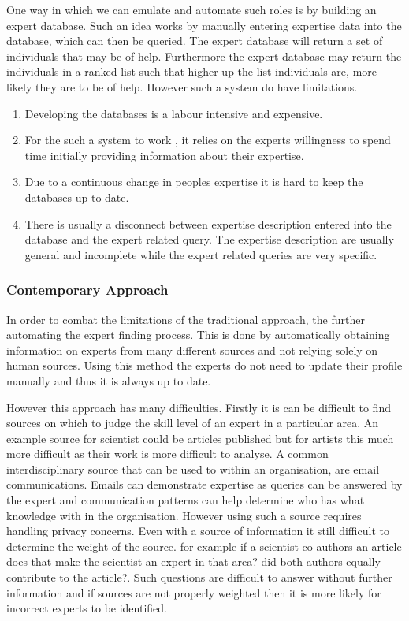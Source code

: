 \documentclass[a4paper,oneside,11pt]{report}
\begin{document}
One way in which we can emulate and automate such roles is by building an expert database. Such an idea works by manually entering expertise data into the database, which can then be queried. The expert database will return a set of individuals that may be of help. Furthermore the expert database  may return the individuals in a ranked list such that higher up the list individuals are, more likely they are to be of help. However such a system do have limitations\autocite{kobsaseid2003}.
\begin{enumerate}
	\item Developing the databases is a labour intensive and expensive.
	\item For the such a system to work , it relies on the experts willingness to spend time 		  			  initially providing information about their expertise.
	\item Due to a continuous change in peoples expertise it is hard to keep the databases up to 				  date.
	\item There is usually a disconnect between expertise description entered into the database and 	          the expert related query. The expertise description are usually general and incomplete                                                                            		  while the expert related queries are very specific. 
\end{enumerate}

\subsubsection{Contemporary Approach}
In order to combat the limitations of the traditional approach, the further automating the expert finding process. This is done by automatically obtaining information on experts from many different sources and not relying solely on human sources\autocite{kobsaseid2003}. Using this method the experts do not need to update their profile manually and thus it is always up to date. 

However this approach has many difficulties. Firstly it is can be difficult to find sources on which to judge the skill level of an expert in a particular area. An example source for scientist could be articles published but for artists this much more difficult as their work is more difficult to analyse. A common interdisciplinary source that can be used to within an organisation, are email communications. Emails can demonstrate expertise as queries can be answered by the expert and communication patterns can help determine who has what knowledge with in the organisation\autocite{campbell2003}. However using such a source requires handling privacy concerns. 
Even with a source of information it still difficult to determine the weight of the source. for example if a scientist co authors an article does that make the scientist an expert in that area? did both authors equally contribute to the article?. Such questions are difficult to answer without further information and if sources are not properly weighted then it is more likely for incorrect experts to be identified.
\end{document}
